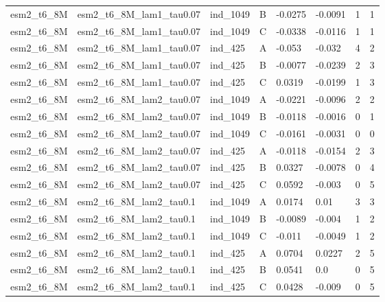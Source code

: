 \begin{table}[ht]
\begin{tabular}{llllllll}
esm2\_t6\_8M & esm2\_t6\_8M\_lam1\_tau0.07 & ind\_1049 & B & -0.0275 & -0.0091 & 1 & 1 \\
esm2\_t6\_8M & esm2\_t6\_8M\_lam1\_tau0.07 & ind\_1049 & C & -0.0338 & -0.0116 & 1 & 1 \\
esm2\_t6\_8M & esm2\_t6\_8M\_lam1\_tau0.07 & ind\_425 & A & -0.053 & -0.032 & 4 & 2 \\
esm2\_t6\_8M & esm2\_t6\_8M\_lam1\_tau0.07 & ind\_425 & B & -0.0077 & -0.0239 & 2 & 3 \\
esm2\_t6\_8M & esm2\_t6\_8M\_lam1\_tau0.07 & ind\_425 & C & 0.0319 & -0.0199 & 1 & 3 \\
esm2\_t6\_8M & esm2\_t6\_8M\_lam2\_tau0.07 & ind\_1049 & A & -0.0221 & -0.0096 & 2 & 2 \\
esm2\_t6\_8M & esm2\_t6\_8M\_lam2\_tau0.07 & ind\_1049 & B & -0.0118 & -0.0016 & 0 & 1 \\
esm2\_t6\_8M & esm2\_t6\_8M\_lam2\_tau0.07 & ind\_1049 & C & -0.0161 & -0.0031 & 0 & 0 \\
esm2\_t6\_8M & esm2\_t6\_8M\_lam2\_tau0.07 & ind\_425 & A & -0.0118 & -0.0154 & 2 & 3 \\
esm2\_t6\_8M & esm2\_t6\_8M\_lam2\_tau0.07 & ind\_425 & B & 0.0327 & -0.0078 & 0 & 4 \\
esm2\_t6\_8M & esm2\_t6\_8M\_lam2\_tau0.07 & ind\_425 & C & 0.0592 & -0.003 & 0 & 5 \\
esm2\_t6\_8M & esm2\_t6\_8M\_lam2\_tau0.1 & ind\_1049 & A & 0.0174 & 0.01 & 3 & 3 \\
esm2\_t6\_8M & esm2\_t6\_8M\_lam2\_tau0.1 & ind\_1049 & B & -0.0089 & -0.004 & 1 & 2 \\
esm2\_t6\_8M & esm2\_t6\_8M\_lam2\_tau0.1 & ind\_1049 & C & -0.011 & -0.0049 & 1 & 2 \\
esm2\_t6\_8M & esm2\_t6\_8M\_lam2\_tau0.1 & ind\_425 & A & 0.0704 & 0.0227 & 2 & 5 \\
esm2\_t6\_8M & esm2\_t6\_8M\_lam2\_tau0.1 & ind\_425 & B & 0.0541 & 0.0 & 0 & 5 \\
esm2\_t6\_8M & esm2\_t6\_8M\_lam2\_tau0.1 & ind\_425 & C & 0.0428 & -0.009 & 0 & 5 \\
\hline
\end{tabular}
\end{table}
